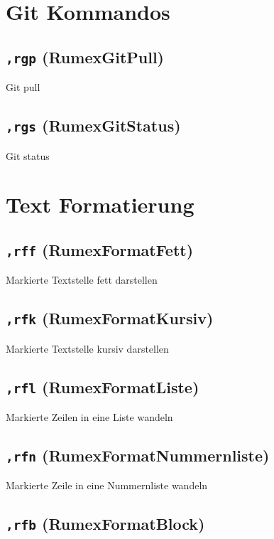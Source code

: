 \section{Git Kommandos}\label{git-kommandos}

\subsection{\texttt{,rgp} (RumexGitPull)}\label{rgp-rumexgitpull}

Git pull

\subsection{\texttt{,rgs} (RumexGitStatus)}\label{rgs-rumexgitstatus}

Git status

\section{Text Formatierung}\label{text-formatierung}

\subsection{\texttt{,rff} (RumexFormatFett)}\label{rff-rumexformatfett}

Markierte Textstelle fett darstellen

\subsection{\texttt{,rfk}
(RumexFormatKursiv)}\label{rfk-rumexformatkursiv}

Markierte Textstelle kursiv darstellen

\subsection{\texttt{,rfl}
(RumexFormatListe)}\label{rfl-rumexformatliste}

Markierte Zeilen in eine Liste wandeln

\subsection{\texttt{,rfn}
(RumexFormatNummernliste)}\label{rfn-rumexformatnummernliste}

Markierte Zeile in eine Nummernliste wandeln

\subsection{\texttt{,rfb}
(RumexFormatBlock)}\label{rfb-rumexformatblock}

